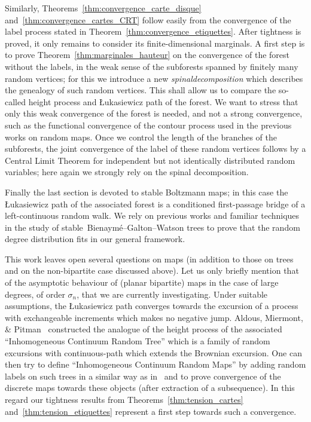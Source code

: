 \documentclass[10pt]{amsart}
\theoremstyle{definition}\newtheorem{defi}[theo]{Definition}\newtheorem{rema}[theo]{Remark}\newtheorem{exam}[theo]{Example}\newtheorem{exem}[theo]{Example}\newtheorem{nota}[theo]{Notation}
\newcommand{\1}{\ensembles{1}}
\providecommand{\?}{}
\begin{document}
Similarly, Theorems~\ref{thm:convergence_carte_disque} and~\ref{thm:convergence_cartes_CRT} follow easily from the convergence of the label process stated in Theorem~\ref{thm:convergence_etiquettes}. After tightness is proved, it only remains to consider its finite-dimensional marginals. A first step is to prove Theorem~\ref{thm:marginales_hauteur} on the convergence of the forest without the labels, in the weak sense of the subforests spanned by finitely many random vertices; for this we introduce a new \emph{spinal\linebreak decomposition} which describes the genealogy of such random vertices. This shall allow us to compare the so-called height process and {\L}ukasiewicz path of the forest. We want to stress that only this weak convergence of the forest is needed, and not a strong convergence, such as the functional convergence of the contour process used in the previous works on random maps. Once we control the length of the branches of the subforests, the joint convergence of the label of these random vertices follows by a Central Limit Theorem for independent but not identically distributed random variables; here again we strongly rely on the spinal decomposition.

Finally the last section is devoted to stable Boltzmann maps; in this case the {\L}ukasiewicz path of the associated forest is a conditioned first-passage bridge of a left-continuous random walk. We rely on previous works and familiar techniques in the study of stable~Bienaymé--Galton--Watson trees to prove that the random degree distribution fits in our general framework.

This work leaves open several questions on maps (in addition to those on trees and on the non-bipartite case discussed above). Let us only briefly mention that of the asymptotic behaviour of (planar bipartite) maps in the case of large degrees, of order $\sigma_n$, that we are currently investigating. Under suitable assumptions, the {\L}ukasiewicz path converges towards the excursion of a process with exchangeable increments which makes no negative jump. Aldous, Miermont, \& Pitman~\cite{AMP04} constructed the analogue of the height process of the associated ``Inhomogeneous Continuum Random Tree'' which is a family of random excursions with continuous-path which extends the Brownian excursion. One can then try to define ``Inhomogeneous Continuum Random Maps'' by adding random labels on such trees in a similar way as in~\cite{LGM11} and to prove convergence of the discrete maps towards these objects (after extraction of a subsequence). In this regard our tightness results from Theorems~\ref{thm:tension_cartes} and~\ref{thm:tension_etiquettes} represent a first step towards such a convergence.
\end{document}
